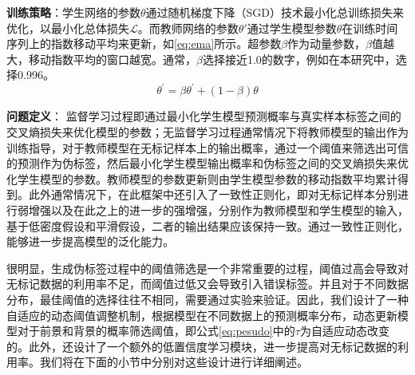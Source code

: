 \documentclass[lang=chs, degree=master, blindreview=false, adobe=false]{yanputhesis}
\begin{document}
\textbf{训练策略}：学生网络的参数$\theta$通过随机梯度下降（SGD）技术最小化总训练损失来优化，以最小化总体损失$\mathcal{L}$。而教师网络的参数$\theta'$通过学生模型参数$\theta$在训练时间序列上的指数移动平均来更新，如\ref{eq:ema}所示。超参数$\beta$作为动量参数，$\beta$值越大，移动指数平均的窗口越宽。通常，$\beta$选择接近1.0的数字，例如在本研究中，选择0.996。
\begin{equation}
  \label{eq:ema}
  \theta^{\prime}=\beta \theta^{\prime}+(1-\beta) \theta
\end{equation}

\textbf{问题定义}：
监督学习过程即通过最小化学生模型预测概率与真实样本标签之间的交叉熵损失来优化模型的参数；无监督学习过程通常情况下将教师模型的输出作为训练指导，对于教师模型在无标记样本上的输出概率，通过一个阈值来筛选出可信的预测作为伪标签，然后最小化学生模型输出概率和伪标签之间的交叉熵损失来优化学生模型的参数。教师模型的参数更新则由学生模型参数的移动指数平均累计得到。此外通常情况下，在此框架中还引入了一致性正则化，即对无标记样本分别进行弱增强以及在此之上的进一步的强增强，分别作为教师模型和学生模型的输入，基于低密度假设和平滑假设，二者的输出结果应该保持一致。通过一致性正则化，能够进一步提高模型的泛化能力。

很明显，生成伪标签过程中的阈值筛选是一个非常重要的过程，阈值过高会导致对无标记数据的利用率不足，而阈值过低又会导致引入错误标签。并且对于不同数据分布，最佳阈值的选择往往不相同，需要通过实验来验证。因此，我们设计了一种自适应的动态阈值调整机制，根据模型在不同数据上的预测概率分布，动态更新模型对于前景和背景的概率筛选阈值，即公式\ref{eq:pesudo}中的$\tau$为自适应动态改变的。此外，还设计了一个额外的低置信度学习模块，进一步提高对无标记数据的利用率。我们将在下面的小节中分别对这些设计进行详细阐述。
\end{document}
